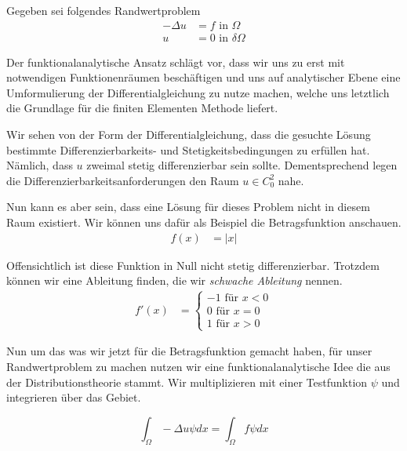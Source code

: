 Gegeben sei folgendes Randwertproblem
\begin{equation} \label{eq:dg}
\begin{aligned}
	- \Delta u &= f \text{ in } \Omega \\
	u &= 0 \text{ in } \delta \Omega	
\end{aligned}
\end{equation}

Der funktionalanalytische Ansatz schlägt vor, dass wir uns zu erst mit notwendigen Funktionenräumen beschäftigen und uns auf analytischer Ebene eine Umformulierung der Differentialgleichung zu nutze machen, welche uns letztlich die Grundlage für die finiten Elementen Methode liefert.

Wir sehen von der Form der Differentialgleichung, dass die gesuchte Lösung bestimmte Differenzierbarkeits- und Stetigkeitsbedingungen zu erfüllen hat. Nämlich, dass $u$ zweimal stetig differenzierbar sein sollte.
Dementsprechend legen die Differenzierbarkeitsanforderungen den Raum $u \in C_{0}^{2}$ nahe.

Nun kann es aber sein, dass eine Lösung für dieses Problem nicht in diesem Raum existiert. Wir können uns dafür als Beispiel die Betragsfunktion anschauen.
\begin{equation}
\begin{aligned}
f(x) &= | x |
\end{aligned}
\end{equation}

Offensichtlich ist diese Funktion in Null nicht stetig differenzierbar. Trotzdem können wir eine Ableitung finden, die wir \textit{schwache Ableitung} nennen. 
\begin{equation}
\begin{aligned}
f'(x) &= 
\begin{cases}
-1 \text{ für } x < 0 \\
0 \text{ für } x = 0  \\
1 \text{ für } x > 0 
\end{cases}
\end{aligned}
\end{equation}

Nun um das was wir jetzt für die Betragsfunktion gemacht haben, für unser Randwertproblem zu machen nutzen wir eine funktionalanalytische Idee die aus der Distributionstheorie stammt.
Wir multiplizieren mit einer Testfunktion $\psi$  und integrieren über das Gebiet.

\begin{equation}
\label{eq:sf1}
\int_{\Omega} - \Delta u \psi dx = \int_{\Omega} f \psi dx
\end{equation}

